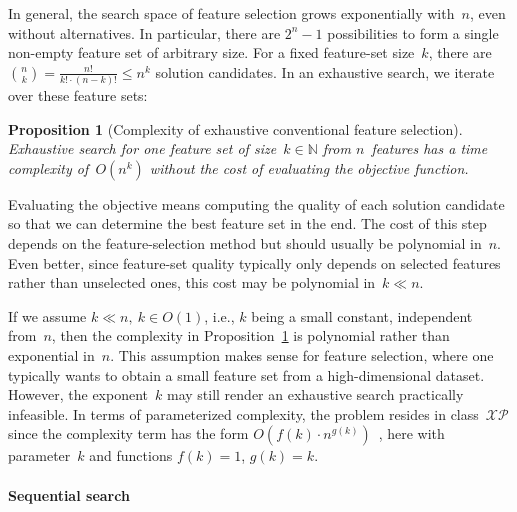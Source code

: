 \documentclass{article}
\newtheorem{proposition}{Proposition}
\theoremstyle{definition}
\begin{document}
In general, the search space of feature selection grows exponentially with~$n$, even without alternatives.
In particular, there are $2^n - 1$ possibilities to form a single non-empty feature set of arbitrary size.
For a fixed feature-set size~$k$, there are $\binom{n}{k} = \frac{n!}{k! \cdot (n-k)!} \leq n^k$ solution candidates.
In an exhaustive search, we iterate over these feature sets:
%
\begin{proposition}[Complexity of exhaustive conventional feature selection]
	Exhaustive search for one feature set of size~$k \in \mathbb{N}$ from $n$~features has a time complexity of~$O(n^k)$ without the cost of evaluating the objective function.
	\label{prop:afs:complexity-exhaustive-conventional}
\end{proposition}
%
Evaluating the objective means computing the quality of each solution candidate so that we can determine the best feature set in the end.
The cost of this step depends on the feature-selection method but should usually be polynomial in~$n$.
Even better, since feature-set quality typically only depends on selected features rather than unselected ones, this cost may be polynomial in~$k \ll n$.

If we assume $k \ll n,~k \in O(1)$, i.e., $k$ being a small constant, independent from~$n$, then the complexity in Proposition~\ref{prop:afs:complexity-exhaustive-conventional} is polynomial rather than exponential in~$n$.
This assumption makes sense for feature selection, where one typically wants to obtain a small feature set from a high-dimensional dataset.
However, the exponent~$k$ may still render an exhaustive search practically infeasible.
In terms of parameterized complexity, the problem resides in class~$\mathcal{XP}$ since the complexity term has the form $O(f(k) \cdot n^{g(k)})$~\cite{downey1997parameterized}, here with parameter~$k$ and functions $f(k) = 1$, $g(k) = k$.

\paragraph{Sequential search}
\end{document}
